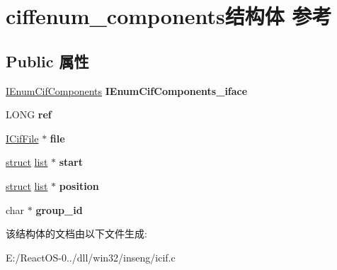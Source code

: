 \hypertarget{structciffenum__components}{}\section{ciffenum\+\_\+components结构体 参考}
\label{structciffenum__components}
\subsection*{Public 属性}
\begin{DoxyCompactItemize}
\item 
\mbox{\label{structciffenum__components_a02b1895f9e9baabaf9ac82aa6e091764}} 
\hyperlink{interface_i_enum_cif_components}{I\+Enum\+Cif\+Components} {\bfseries I\+Enum\+Cif\+Components\+\_\+iface}
\item 
\mbox{\label{structciffenum__components_a60a84c502e912a318f4c237363d42ef0}} 
L\+O\+NG {\bfseries ref}
\item 
\mbox{\label{structciffenum__components_a9477c49990ba2dcccaf687576307dbe0}} 
\hyperlink{interface_i_cif_file}{I\+Cif\+File} $\ast$ {\bfseries file}
\item 
\mbox{\label{structciffenum__components_a747db2c53eda049af29d7237777fb79e}} 
\hyperlink{interfacestruct}{struct} \hyperlink{classlist}{list} $\ast$ {\bfseries start}
\item 
\mbox{\label{structciffenum__components_ae4bd24679771677c076abfcabab2aac6}} 
\hyperlink{interfacestruct}{struct} \hyperlink{classlist}{list} $\ast$ {\bfseries position}
\item 
\mbox{\label{structciffenum__components_a35ee08cdae5e6b2e45aec907069be46d}} 
char $\ast$ {\bfseries group\+\_\+id}
\end{DoxyCompactItemize}


该结构体的文档由以下文件生成\+:\begin{DoxyCompactItemize}
\item 
E\+:/\+React\+O\+S-\/0../dll/win32/inseng/icif.\+c\end{DoxyCompactItemize}
